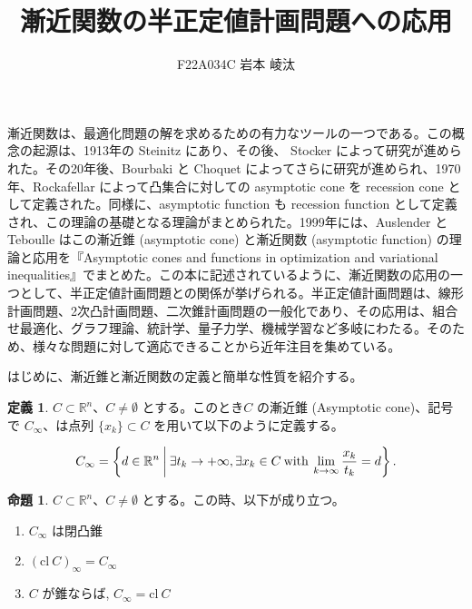 \documentclass[a4paper,11pt]{jsarticle}
\theoremstyle{definition}
\newtheorem{prop}[thm]{命題}
\newtheorem{dfn}[thm]{定義}
\newcommand{\NDemenstionalRealEuclideanSpace}{\mathbb{R}^n}
\begin{document}
\title{漸近関数の半正定値計画問題への応用}
\author{F22A034C 岩本 崚汰}
\date{\vspace{-0ex}}

\maketitle

漸近関数は、最適化問題の解を求めるための有力なツールの一つである。この概念の起源は、1913年の Steinitz にあり、その後、 Stocker によって研究が進められた。その20年後、Bourbaki と Choquet によってさらに研究が進められ、1970年、Rockafellar によって凸集合に対しての asymptotic cone を recession cone として定義された。同様に、asymptotic function も recession function として定義され、この理論の基礎となる理論がまとめられた。1999年には、Auslender と Teboulle はこの漸近錐 (asymptotic cone) と漸近関数 (asymptotic function) の理論と応用を『Asymptotic cones and functions in optimization and variational inequalities』でまとめた。この本に記述されているように、漸近関数の応用の一つとして、半正定値計画問題との関係が挙げられる。半正定値計画問題は、線形計画問題、2次凸計画問題、二次錐計画問題の一般化であり、その応用は、組合せ最適化、グラフ理論、統計学、量子力学、機械学習など多岐にわたる。そのため、様々な問題に対して適応できることから近年注目を集めている。

はじめに、漸近錐と漸近関数の定義と簡単な性質を紹介する。

\begin{dfn}
  $C \subset \NDemenstionalRealEuclideanSpace$、$C \neq \emptyset$ とする。このとき$C$ の漸近錐 (Asymptotic cone)、記号で $C_\infty$、は点列 $\{ x_k \} \subset C$ を用いて以下のように定義する。

  \begin{equation}
    C_\infty = \left\{ d \in
    \mathbb{R}^n \:\middle|\: \exists t_k \rightarrow +\infty, \exists x_k \in C \:\text{\rm with}\: \lim_{k \to \infty} \frac{x_k}{t_k} = d \right\}. \notag
  \end{equation}
\end{dfn}

\begin{prop}
  $C \subset \NDemenstionalRealEuclideanSpace$、$C \neq \emptyset$ とする。この時、以下が成り立つ。
  \begin{enumerate}
    \item $C_{\infty}$ は閉凸錐
    \item $(\text{cl}\:C)_{\infty} = C_{\infty}$
    \item $C$ が錐ならば, $C_{\infty} = \text{cl}\:C$
  \end{enumerate}
\end{prop}
\end{document}
